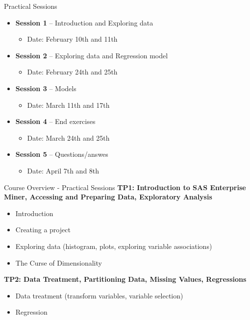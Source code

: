 \begin{frame}[fragile]{Practical Sessions}
\begin{itemize}
    \item \textbf{Session 1} -- Introduction and Exploring data
    \begin{itemize}
      \item Date: February 10th and 11th
    \end{itemize}
    \vfill
    \item \textbf{Session 2} -- Exploring data and Regression model
    \begin{itemize}
      \item Date: February 24th and 25th
    \end{itemize}
    \vfill
    \item \textbf{Session 3} -- Models
    \begin{itemize}
      \item Date: March 11th and 17th
    \end{itemize}
    \vfill
    \item \textbf{Session 4} -- End exercises 
    \begin{itemize}
      \item Date: March 24th and 25th
    \end{itemize}
    \vfill
    \item \textbf{Session 5} -- Questions/answes
    \begin{itemize}
      \item Date: April 7th and 8th
    \end{itemize}
\end{itemize}
\end{frame}

\begin{frame}{Course Overview - Practical Sessions}
\textbf{TP1: Introduction to SAS Enterprise Miner, Accessing and Preparing Data, Exploratory Analysis}
\begin{itemize}
    \item Introduction
    \item Creating a project
    \item Exploring data (histogram, plots, exploring variable associations)
    \item The Curse of Dimensionality
\end{itemize}

\vspace{0.5cm}
\textbf{TP2: Data Treatment, Partitioning Data, Missing Values, Regressions}
\begin{itemize}
    \item Data treatment (transform variables, variable selection)
    \item Regression
\end{itemize}
\end{frame}

